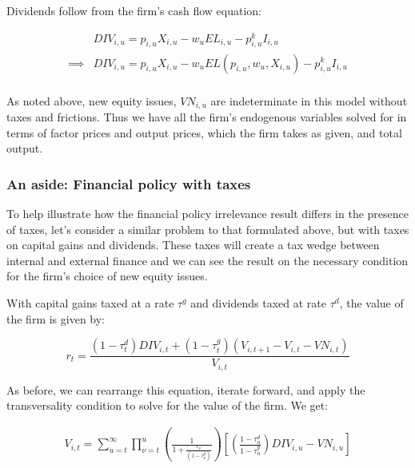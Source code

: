 \documentclass[letterpaper,12pt]{article}
\theoremstyle{definition}
\begin{document}
\begin{spacing}{1.5}
Dividends follow from the firm's cash flow equation:

\begin{equation}
\label{eqn:solve_dyn_div}
\begin{split}
 &DIV_{i,u} = p_{i,u}X_{i,u} - w_{u}EL_{i,u}-p^{k}_{i,u}I_{i,u} \\
\implies &DIV_{i,u} = p_{i,u}X_{i,u} - w_{u}EL(p_{i,u},w_{u},X_{i,u}) - p^{k}_{i,u}I_{i,u} \\
\end{split}
\end{equation}

As noted above, new equity issues, $VN_{i,u}$ are indeterminate in this model without taxes and frictions.  Thus we have all the firm's endogenous variables solved for in terms of factor prices and output prices, which the firm takes as given, and total output.

\subsubsection*{An aside: Financial policy with taxes}
To help illustrate how the financial policy irrelevance result differs in the presence of taxes, let's consider a similar problem to that formulated above, but with taxes on capital gains and dividends.  These taxes will create a tax wedge between internal and external finance and we can see the result on the necessary condition for the firm's choice of new equity issues.

With capital gains taxed at a rate $\tau^{g}$ and dividends taxed at rate $\tau^{d}$, the value of the firm is given by:


\begin{equation}
r_{t} = \frac{(1-\tau^{d}_{t})DIV_{i,t}+(1-\tau^{g}_{t})(V_{i,t+1}-V_{i,t}-VN_{i,t})}{V_{i,t}}
\end{equation} 

As before, we can rearrange this equation, iterate forward, and apply the transversality condition to solve for the value of the firm.  We get:

\begin{equation}
\label{eqn:v_firm_tax}
\begin{split}
 V_{i,t}= \sum_{u=t}^{\infty} \prod_{\nu=t}^{u}\left(\frac{1}{1+\frac{r_{\nu}}{(1-\tau^{g}_{\nu})}}\right)\left[ \left(\frac{1-\tau^{d}_{u}}{1-\tau^{g}_{u}}\right)DIV_{i,u}-VN_{i,u} \right] \\
\end{split}
\end{equation}


\end{spacing}
\end{document}
